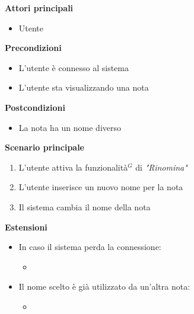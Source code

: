 \documentclass[a4paper,10pt]{article}
\begin{document}
    \textbf{Attori principali}
    \begin{itemize}
        \item Utente
    \end{itemize}
    \textbf{Precondizioni}
    \begin{itemize}
        \item L'utente è connesso al sistema
        \item L'utente sta visualizzando una nota
    \end{itemize}
    \textbf{Postcondizioni}
    \begin{itemize}
        \item La nota ha un nome diverso
    \end{itemize}
    \textbf{Scenario principale}
    \begin{enumerate}
        \item L'utente attiva la funzionalità$^G$ di \textit{"Rinomina"}
        \item L'utente inserisce un nuovo nome per la nota
        \item Il sistema cambia il nome della nota
    \end{enumerate}
    \textbf{Estensioni}
    \begin{itemize}
        \item In caso il sistema perda la connessione:
        \begin{itemize}
            \item {}
        \end{itemize}
        \item Il nome scelto è già utilizzato da un'altra nota:
        \begin{itemize}
            \item {}
        \end{itemize}
    \end{itemize}
\end{document}
